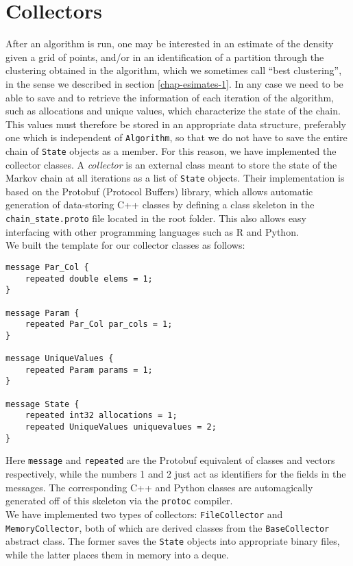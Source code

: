 \section{Collectors}\label{collectors}
After an algorithm is run, one may be interested in an estimate of the density given a grid of points, and/or in an identification of a partition through the clustering obtained in the algorithm, which we sometimes call ``best clustering'', in the sense we described in section \ref{chap-esimates-1}.
In any case we need to be able to save and to retrieve the information of each iteration of the algorithm, such as allocations and unique values, which characterize the state of the chain.
This values must therefore be stored in an appropriate data structure, preferably one which is independent of \verb|Algorithm|, so that we do not have to save the entire chain of \verb|State| objects as a member.
For this reason, we have implemented the collector classes.
A \emph{collector} is an external class meant to store the state of the Markov chain at all iterations as a list of \verb|State| objects.
Their implementation is based on the Protobuf (Protocol Buffers) library, which allows automatic generation of data-storing C++ classes by defining a class skeleton in the \verb|chain_state.proto| file located in the root folder.
This also allows easy interfacing with other programming languages such as R and Python. \\
We built the template for our collector classes as follows:
\begin{verbatim}
message Par_Col {
    repeated double elems = 1;
}

message Param {
    repeated Par_Col par_cols = 1;
}

message UniqueValues {
    repeated Param params = 1;
}

message State {
    repeated int32 allocations = 1;
    repeated UniqueValues uniquevalues = 2;
}
\end{verbatim}
Here \verb|message| and \verb|repeated| are the Protobuf equivalent of classes and vectors respectively, while the numbers 1 and 2 just act as identifiers for the fields in the messages.
The corresponding C++ and Python classes are automagically generated off of this skeleton via the \verb|protoc| compiler. \\
We have implemented two types of collectors: \verb|FileCollector| and \verb|MemoryCollector|, both of which are derived classes from the \verb|BaseCollector| abstract class.
The former saves the \verb|State| objects into appropriate binary files, while the latter places them in memory into a deque.
